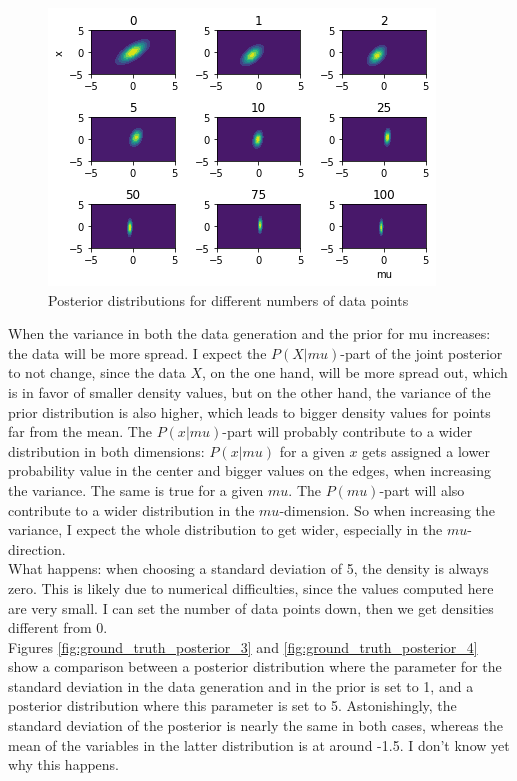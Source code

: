 \documentclass{article}
\begin{document}
\begin{figure}
	\includegraphics[width=\textwidth]{images/posterior_different_data_sizes.png}
	\caption[Posterior distributions for different numbers of data points]{Posterior distributions for different numbers of data points}
	\label{fig:posterior_different_data_sizes}
\end{figure}
When the variance in both the data generation and the prior for mu increases: the data will be more spread. I expect the $P(X|mu)$-part of the joint posterior to not change, since the data $X$, on the one hand, will be more spread out, which is in favor of smaller density values, but on the other hand, the variance of the prior distribution is also higher, which leads to bigger density values for points far from the mean. The $P(x|mu)$-part will probably contribute to a wider distribution in both dimensions: $P(x|mu)$ for a given $x$ gets assigned a lower probability value in the center and bigger values on the edges, when increasing the variance. The same is true for a given $mu$. The $P(mu)$-part will also contribute to a wider distribution in the $mu$-dimension.
So when increasing the variance, I expect the whole distribution to get wider, especially in the $mu$-direction.
\\
What happens: when choosing a standard deviation of 5, the density is always zero. This is likely due to numerical difficulties, since the values computed here are very small.
I can set the number of data points down, then we get densities different from 0.
\\
Figures  \ref{fig:ground_truth_posterior_3} and \ref{fig:ground_truth_posterior_4} show a comparison between a posterior distribution where the parameter for the standard deviation in the data generation and in the prior is set to 1, and a posterior distribution where this parameter is set to 5. Astonishingly, the standard deviation of the posterior is nearly the same in both cases, whereas the mean of the variables in the latter distribution is at around -1.5. I don't know yet why this happens. 
\end{document}
